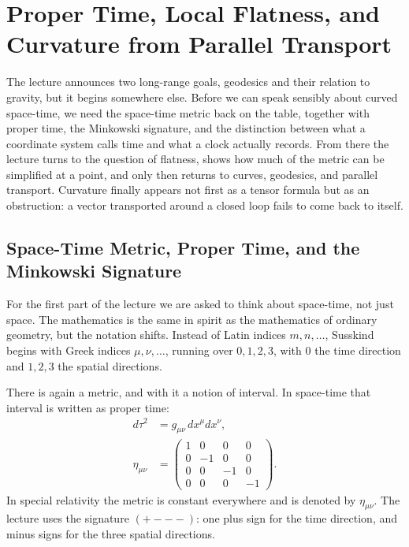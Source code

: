 \chapter{Proper Time, Local Flatness, and Curvature from Parallel Transport}

The lecture announces two long-range goals, geodesics and their relation to gravity, but it begins somewhere else. Before we can speak sensibly about curved space-time, we need the space-time metric back on the table, together with proper time, the Minkowski signature, and the distinction between what a coordinate system calls time and what a clock actually records. From there the lecture turns to the question of flatness, shows how much of the metric can be simplified at a point, and only then returns to curves, geodesics, and parallel transport. Curvature finally appears not first as a tensor formula but as an obstruction: a vector transported around a closed loop fails to come back to itself.

\section{Space-Time Metric, Proper Time, and the Minkowski Signature}

For the first part of the lecture we are asked to think about space-time, not just space. The mathematics is the same in spirit as the mathematics of ordinary geometry, but the notation shifts. Instead of Latin indices \(m,n,\ldots\), Susskind begins with Greek indices \(\mu,\nu,\ldots\), running over \(0,1,2,3\), with \(0\) the time direction and \(1,2,3\) the spatial directions.

There is again a metric, and with it a notion of interval. In space-time that interval is written as proper time:
\begin{align}
d\tau^{2} &= g_{\mu\nu}\,dx^{\mu}dx^{\nu}, \\
\eta_{\mu\nu} &=
\begin{pmatrix}
1 & 0 & 0 & 0 \\
0 & -1 & 0 & 0 \\
0 & 0 & -1 & 0 \\
0 & 0 & 0 & -1
\end{pmatrix}.
\end{align}
In special relativity the metric is constant everywhere and is denoted by \(\eta_{\mu\nu}\). The lecture uses the signature \((+---)\): one plus sign for the time direction, and minus signs for the three spatial directions.

